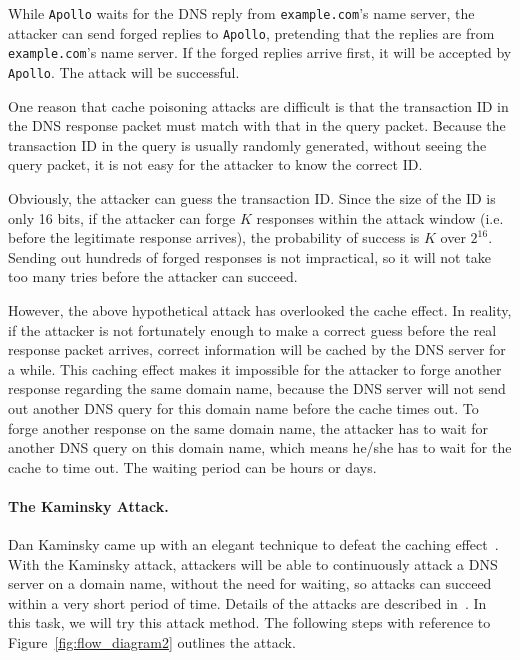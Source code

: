 While {\tt Apollo} waits for the DNS reply from {\tt example.com}'s name
server, the attacker can send forged replies to {\tt Apollo}, pretending 
that the replies are from {\tt example.com}'s name server. If the forged 
replies arrive first, it will be accepted by {\tt Apollo}. The attack will
be successful.


One reason that cache poisoning attacks are difficult
is that the transaction ID
in the DNS response packet must match with that 
in the query packet. Because the transaction ID in the query is 
usually randomly generated, without seeing the query packet,
it is not easy for the attacker to know the correct ID.


Obviously, the attacker can guess the transaction ID. Since the
size of the ID is only 16 bits, if the attacker can forge $K$ 
responses within the attack window (i.e. before the legitimate
response arrives), the probability of success is $K$ over $2^{16}$.
Sending out hundreds of forged responses is not impractical, so
it will not take too many tries before the attacker can succeed. 


However, the above hypothetical attack has overlooked the cache effect.
In reality, if the attacker is not fortunately enough to make a correct guess before
the real response packet arrives, correct information will be cached 
by the DNS server for a while. This caching effect makes it impossible
for the attacker to forge another response regarding the same 
domain name, because the DNS server will not send out another DNS query for 
this domain name before the cache times out.
To forge another response on the same domain name, the attacker has to 
wait for another DNS query on this domain name, which means he/she has to
wait for the cache to time out. The waiting period can be hours or days.


\paragraph{The Kaminsky Attack.} 
Dan Kaminsky came up with an elegant technique to defeat the caching effect~\cite{Kaminsky}.
With the Kaminsky attack, attackers will be able to continuously attack
a DNS server on a domain name, without the need for waiting, so
attacks can succeed within a very short period of time.
Details of the attacks are described in~\cite{Kaminsky}. 
In this task, we will try this attack method. The following steps with reference to 
Figure~\ref{fig:flow_diagram2} outlines the attack. 

